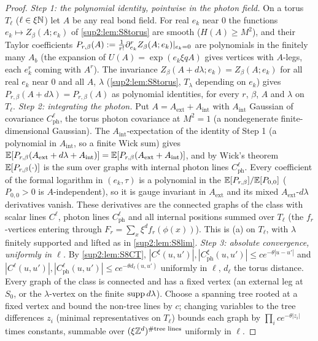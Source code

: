 \begin{proof}
\emph{Step 1: the polynomial identity, pointwise in the photon field.} On a torus $T_\ell$ ($\ell\in\xi\mathbb N$) let $A$ be any real bond field. For real $e_k$ near $0$ the functions $e_k\mapsto Z_\beta(A;e_k)$ of \cref{sup2:lem:S8torus} are smooth ($H(A)\ge M^2$), and their Taylor coefficients $P_{r,\beta}(A):=\frac1{r!}\partial^r_{e_k}Z_\beta(A;e_k)|_{e_k=0}$ are polynomials in the finitely many $A_b$ (the expansion of $U(A)=\exp(e_k\xi qA)$ gives vertices with $A$-legs, each $e_k^r$ coming with $A^r$). The invariance $Z_\beta(A+d\lambda;e_k)=Z_\beta(A;e_k)$ for all real $e_k$ near $0$ and all $A$, $\lambda$ (\cref{sup2:lem:S8torus}, $T_\lambda$ depending on $e_k$) gives $P_{r,\beta}(A+d\lambda)=P_{r,\beta}(A)$ as polynomial identities, for every $r$, $\beta$, $A$ and $\lambda$ on $T_\ell$.
\emph{Step 2: integrating the photon.} Put $A=A_{\mathrm{ext}}+A_{\mathrm{int}}$ with $A_{\mathrm{int}}$ Gaussian of covariance $C^\ell_{\mathrm{ph}}$, the torus photon covariance at $M^2=1$ (a nondegenerate finite-dimensional Gaussian). The $A_{\mathrm{int}}$-expectation of the identity of Step 1 (a polynomial in $A_{\mathrm{int}}$, so a finite Wick sum) gives $\mathbb E[P_{r,\beta}(A_{\mathrm{ext}}+d\lambda+A_{\mathrm{int}})]=\mathbb E[P_{r,\beta}(A_{\mathrm{ext}}+A_{\mathrm{int}})]$, and by Wick's theorem $\mathbb E[P_{r,\beta}(\cdot)]$ is the sum over graphs with internal photon lines $C^\ell_{\mathrm{ph}}$. Every coefficient of the formal logarithm in $(e_k,\tau)$ is a polynomial in the $\mathbb E[P_{r,\beta}]/\mathbb E[P_{0,0}]$ ($P_{0,0}>0$ is $A$-independent), so it is gauge invariant in $A_{\mathrm{ext}}$ and its mixed $A_{\mathrm{ext}}$-$d\lambda$ derivatives vanish. These derivatives are the connected graphs of the class with scalar lines $C^\ell$, photon lines $C^\ell_{\mathrm{ph}}$ and all internal positions summed over $T_\ell$ (the $f_r$-vertices entering through $F_r=\sum_x\xi^df_r(\phi(x))$). This is (a) on $T_\ell$, with $\lambda$ finitely supported and lifted as in \cref{sup2:lem:S8lim}.
\emph{Step 3: absolute convergence, uniformly in $\ell$.} By \cref{sup2:lem:S8CT}, $|C^\xi(u,u')|,|C^\xi_{\mathrm{ph}}(u,u')|\le ce^{-\theta|u-u'|}$ and $|C^\ell(u,u')|,|C^\ell_{\mathrm{ph}}(u,u')|\le ce^{-\theta d_\ell(u,u')}$ uniformly in $\ell$, $d_\ell$ the torus distance. Every graph of the class is connected and has a fixed vertex (an external leg at $S_0$, or the $\lambda$-vertex on the finite $\operatorname{supp} d\lambda$). Choose a spanning tree rooted at a fixed vertex and bound the non-tree lines by $c$; changing variables to the tree differences $z_i$ (minimal representatives on $T_\ell$) bounds each graph by $\prod_ice^{-\theta|z_i|}$ times constants, summable over $(\xi\mathbb Z^d)^{\#\text{tree lines}}$ uniformly in $\ell$.

\end{proof}
